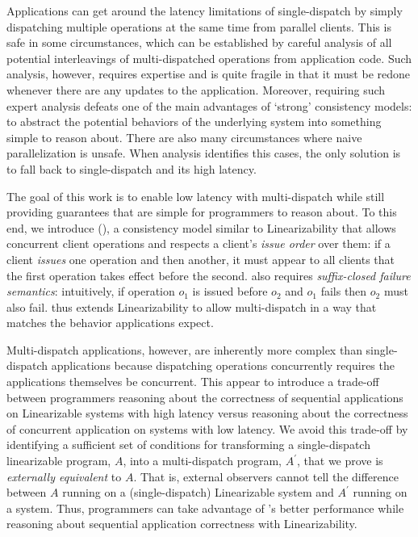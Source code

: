 Applications can get around the latency limitations of single-dispatch by simply dispatching multiple operations at the same time from parallel clients.
This is safe in some circumstances, which can be established by careful analysis of all potential interleavings of multi-dispatched operations from application code.
Such analysis, however, requires expertise and is quite fragile in that it must be redone whenever there are any updates to the application.
Moreover, requiring such expert analysis defeats one of the main advantages of `strong' consistency models:
to abstract the potential behaviors of the underlying system into something simple to reason about.
There are also many circumstances where naive parallelization is unsafe. When analysis identifies this cases, the only solution is to fall back to single-dispatch and its high latency.




The goal of this work is to enable low latency with multi-dispatch while still providing guarantees that are simple for programmers to reason about.
To this end, we introduce \mdllong{} (\mdl{}), a consistency model similar to Linearizability that allows concurrent client operations and respects a client's \textit{issue order} over them:
if a client \textit{issues} one operation and then another, it must appear to all clients that the first operation takes effect before the second.
\mdl{} also requires \textit{suffix-closed failure semantics}:
intuitively, if operation $o_1$ is issued before $o_2$ and $o_1$ fails then $o_2$ must also fail.
\Mdl{} thus extends Linearizability to allow multi-dispatch in a way that matches the behavior applications expect.

Multi-dispatch applications, however, are inherently more complex than single-dispatch applications because dispatching operations concurrently requires the applications themselves be concurrent.
This appear to introduce a trade-off between programmers reasoning about the correctness of sequential applications on Linearizable systems with high latency versus reasoning about the correctness of concurrent application on \mdl{} systems with low latency.
We avoid this trade-off by identifying a sufficient set of conditions for transforming a single-dispatch linearizable program, $A$, into a multi-dispatch program, $A^\prime$, that we prove is \textit{externally equivalent} to $A$. That is, external observers cannot tell the difference between $A$ running on a (single-dispatch) Linearizable system and $A^\prime$ running on a \mdl{} system. Thus, programmers can take advantage of \mdl{}'s better performance while reasoning about sequential application correctness with Linearizability.

